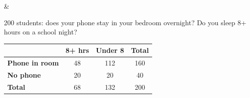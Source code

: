 \documentclass[12pt]{article}
\begin{document}
\small
\begin{guidednotes}
 &
\begin{minipage}[c]{0.40\linewidth}\raggedright
200 students: does your phone stay in your bedroom overnight? Do you sleep 8+ hours on a
school night?
\end{minipage}\hfill
\begin{minipage}[c]{0.58\linewidth}
\centering\footnotesize
\setlength{\tabcolsep}{3pt}\renewcommand{\arraystretch}{1.15}
\begin{tabular}{@{} l | c c | c @{}}
 & \textbf{8+ hrs} & \textbf{Under 8} & \textbf{Total} \\ \hline
\textbf{Phone in room} & 48 & 112 & 160 \\
\textbf{No phone} & 20 & 20 & 40 \\ \hline
\textbf{Total} & 68 & 132 & 200 \\
\end{tabular}
\end{minipage}


\end{guidednotes}
\end{document}
